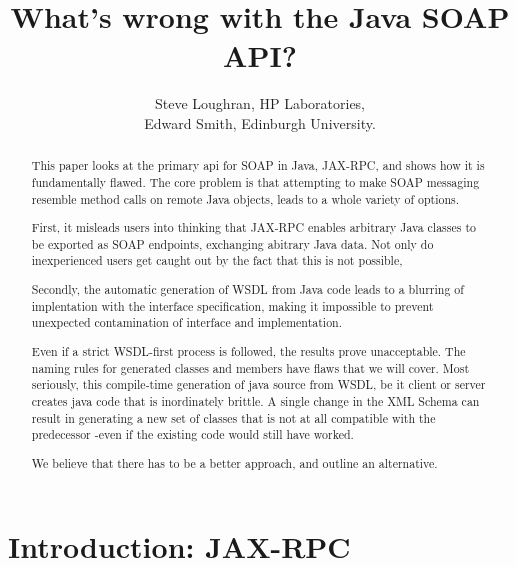 \documentclass[draft]{article}
\begin{document}




\title{What's wrong with the Java SOAP API?}
\author{
    Steve Loughran, HP Laboratories,\\
    Edward Smith, Edinburgh University. 
    }
\maketitle
\begin{abstract}

This paper looks at the primary api for SOAP in Java, JAX-RPC, and
shows how it is fundamentally flawed. The core problem is that attempting
to make SOAP messaging resemble method calls on remote Java objects, leads
to a whole variety of options. 

First, it misleads users into thinking that JAX-RPC enables arbitrary Java classes
to be exported as SOAP endpoints, exchanging abitrary Java data. Not only do 
inexperienced users get caught out by the fact that this is not possible, 

Secondly, the automatic generation of WSDL from Java code leads to a blurring
of implentation with the interface specification, making it impossible to prevent
unexpected contamination of interface and implementation.

Even if a strict WSDL-first process is followed, the results prove unacceptable.
The naming rules for generated classes and members have flaws that we will cover.
Most seriously, this compile-time generation of java source from WSDL,
be it client or server creates java code that is inordinately brittle. A single change
in the XML Schema can result in generating a new set of classes that is not
at all compatible with the predecessor -even if the existing code would still have worked.

We believe that there has to be a better approach, and outline an alternative.



\end{abstract}




\section{Introduction: JAX-RPC}
\end{document}
